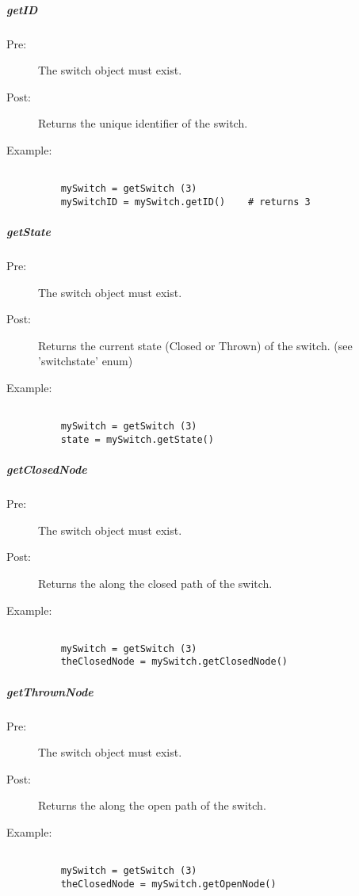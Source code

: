 \documentclass[a4paper,11pt,notitlepage]{article}
\begin{document}
\subparagraph{getID}
\begin{description}
\item[\hspace{1cm}Pre:] The switch object must exist.
\item[\hspace{1cm}Post:] Returns the unique identifier of the switch.
\item[\hspace{1cm}Example:]
\begin{verbatim}

    mySwitch = getSwitch (3)
    mySwitchID = mySwitch.getID()    # returns 3
\end{verbatim}
\end{description}

\subparagraph{getState}
\begin{description}
\item[\hspace{1cm}Pre:] The switch object must exist.
\item[\hspace{1cm}Post:] Returns the current state (Closed or Thrown) of the switch. (see 'switchstate' enum)
\item[\hspace{1cm}Example:]
\begin{verbatim}

    mySwitch = getSwitch (3)
    state = mySwitch.getState()
\end{verbatim}
\end{description}

\subparagraph{getClosedNode}
\begin{description}
\item[\hspace{1cm}Pre:] The switch object must exist.
\item[\hspace{1cm}Post:] Returns the \TN along the closed path of the switch.
\item[\hspace{1cm}Example:]
\begin{verbatim}

    mySwitch = getSwitch (3)
    theClosedNode = mySwitch.getClosedNode()
\end{verbatim}
\end{description}

\subparagraph{getThrownNode}
\begin{description}
\item[\hspace{1cm}Pre:] The switch object must exist.
\item[\hspace{1cm}Post:] Returns the \TN along the open path of the switch.
\item[\hspace{1cm}Example:]
\begin{verbatim}

    mySwitch = getSwitch (3)
    theClosedNode = mySwitch.getOpenNode()
\end{verbatim}
\end{description}
\end{document}
